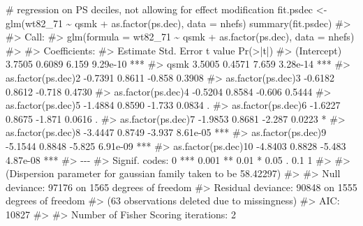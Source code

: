 \documentclass[
  10pt,
  a4paper,
]{book}
\newenvironment{Shaded}{\begin{snugshade}}{\end{snugshade}}
\newcommand{\AttributeTok}[1]{\textcolor[rgb]{0.40,0.45,0.13}{#1}}
\newcommand{\CommentTok}[1]{\textcolor[rgb]{0.37,0.37,0.37}{#1}}
\newcommand{\FunctionTok}[1]{\textcolor[rgb]{0.28,0.35,0.67}{#1}}
\newcommand{\NormalTok}[1]{\textcolor[rgb]{0.00,0.46,0.62}{#1}}
\newcommand{\OtherTok}[1]{\textcolor[rgb]{0.00,0.46,0.62}{#1}}
\newcommand{\SpecialCharTok}[1]{\textcolor[rgb]{0.37,0.37,0.37}{#1}}
\begin{document}
\begin{Shaded}
\begin{Highlighting}[]
\CommentTok{\# regression on PS deciles, not allowing for effect modification}
\NormalTok{fit.psdec }\OtherTok{\textless{}{-}} \FunctionTok{glm}\NormalTok{(wt82\_71 }\SpecialCharTok{\textasciitilde{}}\NormalTok{ qsmk }\SpecialCharTok{+} \FunctionTok{as.factor}\NormalTok{(ps.dec), }\AttributeTok{data =}\NormalTok{ nhefs)}
\FunctionTok{summary}\NormalTok{(fit.psdec)}
\CommentTok{\#\textgreater{} }
\CommentTok{\#\textgreater{} Call:}
\CommentTok{\#\textgreater{} glm(formula = wt82\_71 \textasciitilde{} qsmk + as.factor(ps.dec), data = nhefs)}
\CommentTok{\#\textgreater{} }
\CommentTok{\#\textgreater{} Coefficients:}
\CommentTok{\#\textgreater{}                     Estimate Std. Error t value Pr(\textgreater{}|t|)    }
\CommentTok{\#\textgreater{} (Intercept)           3.7505     0.6089   6.159 9.29e{-}10 ***}
\CommentTok{\#\textgreater{} qsmk                  3.5005     0.4571   7.659 3.28e{-}14 ***}
\CommentTok{\#\textgreater{} as.factor(ps.dec)2   {-}0.7391     0.8611  {-}0.858   0.3908    }
\CommentTok{\#\textgreater{} as.factor(ps.dec)3   {-}0.6182     0.8612  {-}0.718   0.4730    }
\CommentTok{\#\textgreater{} as.factor(ps.dec)4   {-}0.5204     0.8584  {-}0.606   0.5444    }
\CommentTok{\#\textgreater{} as.factor(ps.dec)5   {-}1.4884     0.8590  {-}1.733   0.0834 .  }
\CommentTok{\#\textgreater{} as.factor(ps.dec)6   {-}1.6227     0.8675  {-}1.871   0.0616 .  }
\CommentTok{\#\textgreater{} as.factor(ps.dec)7   {-}1.9853     0.8681  {-}2.287   0.0223 *  }
\CommentTok{\#\textgreater{} as.factor(ps.dec)8   {-}3.4447     0.8749  {-}3.937 8.61e{-}05 ***}
\CommentTok{\#\textgreater{} as.factor(ps.dec)9   {-}5.1544     0.8848  {-}5.825 6.91e{-}09 ***}
\CommentTok{\#\textgreater{} as.factor(ps.dec)10  {-}4.8403     0.8828  {-}5.483 4.87e{-}08 ***}
\CommentTok{\#\textgreater{} {-}{-}{-}}
\CommentTok{\#\textgreater{} Signif. codes:  0 \textquotesingle{}***\textquotesingle{} 0.001 \textquotesingle{}**\textquotesingle{} 0.01 \textquotesingle{}*\textquotesingle{} 0.05 \textquotesingle{}.\textquotesingle{} 0.1 \textquotesingle{} \textquotesingle{} 1}
\CommentTok{\#\textgreater{} }
\CommentTok{\#\textgreater{} (Dispersion parameter for gaussian family taken to be 58.42297)}
\CommentTok{\#\textgreater{} }
\CommentTok{\#\textgreater{}     Null deviance: 97176  on 1565  degrees of freedom}
\CommentTok{\#\textgreater{} Residual deviance: 90848  on 1555  degrees of freedom}
\CommentTok{\#\textgreater{}   (63 observations deleted due to missingness)}
\CommentTok{\#\textgreater{} AIC: 10827}
\CommentTok{\#\textgreater{} }
\CommentTok{\#\textgreater{} Number of Fisher Scoring iterations: 2}

\end{Highlighting}
\end{Shaded}
\end{document}
